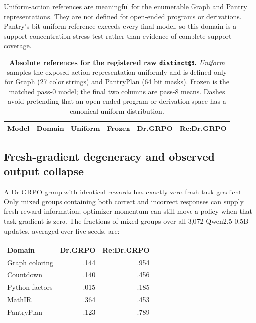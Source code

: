 \documentclass{article}
\makeatletter
\newcommand{\1}{\mathbf 1}
\newcommand{\distk}{\texttt{distinct@8}}
\theoremstyle{remark}
\theoremstyle{definition}
\theoremstyle{plain}
\makeatother
\begin{document}
Uniform-action references are meaningful for the enumerable Graph and
Pantry representations. They are not defined for open-ended programs or
derivations. Pantry's bit-uniform reference exceeds every final model, so
this domain is a support-concentration stress test rather than evidence
of complete support coverage.

\begin{table}[t]
  \centering
  \caption{\textbf{Absolute references for the registered raw \distk{}.}
  \emph{Uniform} samples the exposed action representation uniformly and is
  defined only for Graph (27 color strings) and PantryPlan (64 bit masks).
  Frozen is the matched pass-0 model; the final two columns are pass-8 means.
  Dashes avoid pretending that an open-ended program or derivation space has a
  canonical uniform distribution.}
  \label{tab:absolute-support-references}
  \scriptsize
  \setlength{\tabcolsep}{4.2pt}
  \begin{tabular}{@{}llrrrr@{}}
    \toprule
    \textbf{Model} & \textbf{Domain} & \textbf{Uniform} & \textbf{Frozen}
      & \textbf{Dr.GRPO} & \textbf{Re:Dr.GRPO} \\
    \midrule
    
  \end{tabular}
\end{table}


\subsection{Fresh-gradient degeneracy and observed output collapse}
\label{app:degenerate-groups}

A Dr.GRPO group with identical rewards has exactly zero fresh task gradient.
Only mixed groups containing both correct and incorrect responses can
supply fresh reward information; optimizer momentum can still move a
policy when that task gradient is zero. The fractions of mixed groups
over all 3,072 Qwen2.5-0.5B updates, averaged over five seeds, are:

\begin{center}
\small
\begin{tabular}{@{}lrr@{}}
\toprule
\textbf{Domain} & \textbf{Dr.GRPO} & \textbf{Re:Dr.GRPO} \\
\midrule
Graph coloring & .144 & .954 \\
Countdown & .140 & .456 \\
Python factors & .015 & .185 \\
MathIR & .364 & .453 \\
PantryPlan & .123 & .789 \\
\bottomrule
\end{tabular}
\end{center}
\end{document}
